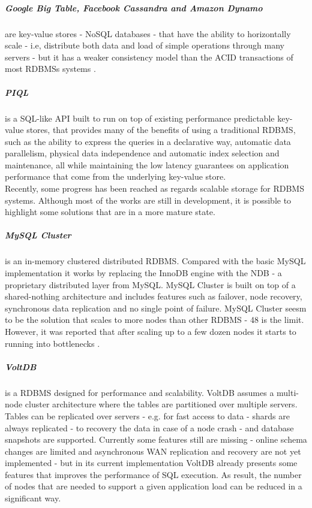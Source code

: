 \subparagraph{Google Big Table, Facebook Cassandra and  Amazon Dynamo} \cite{chang2008bigtable} \cite{lakshman2010cassandra}
\cite{decandia2007dynamo} are key-value stores - \gls{NoSQL} databases - that have the ability to horizontally scale - i.e,
distribute both data and load of simple operations through many servers - but it has a weaker consistency
model than the ACID transactions of most \glspl{RDBMS} systems \cite{cattell2011scalable}.

\subparagraph{\gls{PIQL}} \cite{armbrust2010piql} is a SQL-like API built to run on top of existing
performance predictable key-value stores, that provides many of the benefits of using a traditional
\gls{RDBMS}, such as the ability to express the queries in a declarative way, automatic data
parallelism, physical data independence and automatic index selection and maintenance, all while
maintaining the low latency guarantees on application performance that come from the underlying
key-value store.\\

Recently, some progress has been reached as regards scalable storage for \gls{RDBMS} systems. Although most
of the works are still in development, it is possible to highlight some solutions that are in a more
mature state.

\subparagraph{MySQL Cluster} \cite{ronstrom2004mysql} is an in-memory clustered distributed \gls{RDBMS}.
Compared with the basic MySQL implementation it works by replacing the InnoDB engine with the NDB - a proprietary
distributed layer from MySQL. MySQL Cluster is built on top of a shared-nothing architecture and includes
features such as failover, node recovery, synchronous data replication and no single point of failure.
MySQL Cluster seesm to be the solution that scales to more nodes than other \gls{RDBMS} - 48 is the limit.
However, it was reported that after scaling up to a few dozen nodes it starts to running into
bottlenecks \cite{bunch2010evaluation}.

\subparagraph{VoltDB} \cite{stonebraker2013voltdb} is a \gls{RDBMS} designed for performance and scalability.
VoltDB assumes a multi-node cluster architecture where the tables are partitioned over multiple servers.
Tables can be replicated over servers - e.g. for fast access to data - shards are always replicated -
to recovery the data in case of a node crash - and database snapshots are supported. Currently some
features still are missing - online schema changes are limited and asynchronous \gls{WAN} replication and
recovery are not yet implemented - but in its current implementation VoltDB already presents some
features that improves the performance of SQL execution. As result, the number of nodes that are
needed to support a given application load can be reduced in a significant way.

